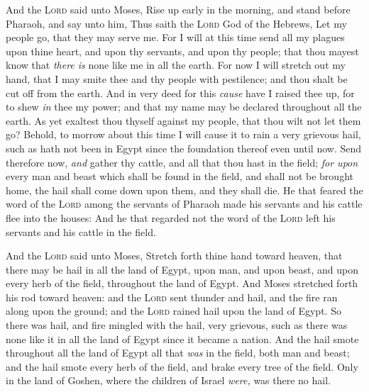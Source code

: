 \documentclass[11pt,letterpaper,oneside]{memoir}
\begin{document}
And the \textsc{Lord} said unto Moses, Rise up early in the morning, and
stand before Pharaoh, and say unto him, Thus saith the \textsc{Lord} God
of the Hebrews, Let my people go, that they may serve me. For I will at
this time send all my plagues upon thine heart, and upon thy servants,
and upon thy people; that thou mayest know that \emph{there is} none
like me in all the earth. For now I will stretch out my hand, that I may
smite thee and thy people with pestilence; and thou shalt be cut off
from the earth. And in very deed for this \emph{cause} have I raised
thee up, for to shew \emph{in} thee my power; and that my name may be
declared throughout all the earth. As yet exaltest thou thyself against
my people, that thou wilt not let them go? Behold, to morrow about this
time I will cause it to rain a very grievous hail, such as hath not been
in Egypt since the foundation thereof even until now. Send therefore
now, \emph{and} gather thy cattle, and all that thou hast in the field;
\emph{for upon} every man and beast which shall be found in the field,
and shall not be brought home, the hail shall come down upon them, and
they shall die. He that feared the word of the \textsc{Lord} among the
servants of Pharaoh made his servants and his cattle flee into the
houses: And he that regarded not the word of the \textsc{Lord} left his
servants and his cattle in the field.

And the \textsc{Lord} said unto Moses, Stretch forth thine hand toward
heaven, that there may be hail in all the land of Egypt, upon man, and
upon beast, and upon every herb of the field, throughout the land of
Egypt. And Moses stretched forth his rod toward heaven: and the
\textsc{Lord} sent thunder and hail, and the fire ran along upon the
ground; and the \textsc{Lord} rained hail upon the land of Egypt. So
there was hail, and fire mingled with the hail, very grievous, such as
there was none like it in all the land of Egypt since it became a
nation. And the hail smote throughout all the land of Egypt all that
\emph{was} in the field, both man and beast; and the hail smote every
herb of the field, and brake every tree of the field. Only in the land
of Goshen, where the children of Israel \emph{were,} was there no hail.
\end{document}
